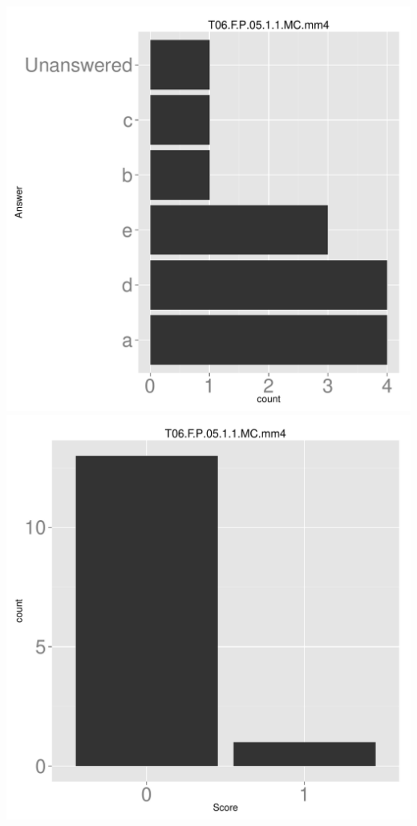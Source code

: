 \documentclass[12pt,english,nohyper]{tufte-handout}\usepackage[]{graphicx}\usepackage[]{color}
\begin{document}
\begin{center} \includegraphics[width=.45\linewidth]{Topic06_AB_60_answer} \includegraphics[width=.45\linewidth]{Topic06_AB_60_score} \end{center} 
\end{document}
